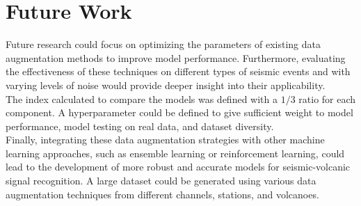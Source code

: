 \documentclass[journal]{IEEEtran}
\begin{document}
\section{Future Work}\label{future_work}
Future research could focus on optimizing the parameters of existing data augmentation methods to improve model performance. Furthermore, evaluating the effectiveness of these techniques on different types of seismic events and with varying levels of noise would provide deeper insight into their applicability. \\
The index calculated to compare the models was defined with a $1/3$ ratio for each component. A hyperparameter could be defined to give sufficient weight to model performance, model testing on real data, and dataset diversity.\\
Finally, integrating these data augmentation strategies with other machine learning approaches, such as ensemble learning or reinforcement learning, could lead to the development of more robust and accurate models for seismic-volcanic signal recognition. 
A large dataset could be generated using various data augmentation techniques from different channels, stations, and volcanoes.


%


\end{document}
